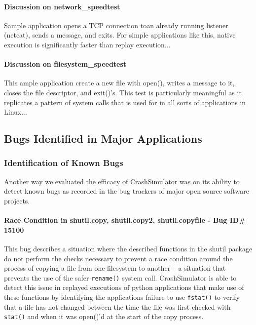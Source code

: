         \paragraph{Discussion on network\_speedtest}

        Sample application opens a TCP connection toan already running listener (netcat), sends a message, and
        exits. For simple applications like this, native execution is significantly faster than replay execution...

        \paragraph{Discussion on filesystem\_speedtest}

        This ample application create a new file with open(), writes a message to it, closes the file descriptor, and
        exit()'s. This test is particularly meaningful as it replicates a pattern of system calls that is used for in
        all sorts of applications in Linux...
            
    \subsection{Bugs Identified in Major Applications}

        \subsubsection{Identification of Known Bugs}

        Another way we evaluated the efficacy of CrashSimulator was on its ability to detect known bugs as recorded in
        the bug trackers of major open source software projects.

            \paragraph{Race Condition in shutil.copy, shutil.copy2, shutil.copyfile - Bug ID\# 15100}
              
            This bug describes a situation where the described functions in the shutil package do not perform the checks
            necessary to prevent a race condition around the process of copying a file from one filesystem to another --
            a situation that prevents the use of the safer {\tt rename()} system call.  CrashSimulator is able to detect this
            issue in replayed executions of python applications that make use of these functions by identifying the
            applications failure to use {\tt fstat()} to verify that a file has not changed between the time the file was
            first checked with {\tt stat()} and when it was open()'d at the start of the copy process.

